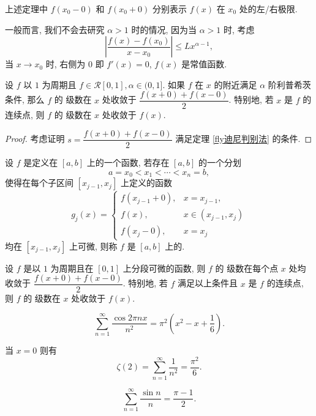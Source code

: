 \begin{remark*}
	上述定理中 $f(x_0-0)$ 和 $f(x_0+0)$ 分别表示 $f(x)$ 在 $x_0$ 处的左/右极限.
\end{remark*}

\begin{remark}
	一般而言, 我们不会去研究 $\alpha>1$ 时的情况, 因为当 $\alpha>1$ 时, 考虑 $$\left|\dfrac{f(x)-f(x_0)}{x-x_0}\right|\leqslant L x^{\alpha-1},$$ 当 $x\to x_0$ 时, 右侧为 $0$ 即 $f'(x)=0$, $f(x)$ 是常值函数.
\end{remark}

\begin{corollary}
	设 $f$ 以 $1$ 为周期且 $f\in\mathscr R[0,1],\alpha\in(0,1]$. 如果 $f$ 在 $x$ 的附近满足 $\alpha$ 阶利普希茨条件, 那么 $f$ 的 \fly 级数在 $x$ 处收敛于 $\dfrac{f(x+0)+f(x-0)}{2}$. 特别地, 若 $x$ 是 $f$ 的连续点, 则 $f$ 的 \fly 级数在 $x$ 处收敛于 $f(x)$.
\end{corollary}

\begin{proof}
	考虑证明 $s=\dfrac{f(x+0)+f(x-0)}{2}$ 满足定理 \ref{fly迪尼判别法} 的条件.
\end{proof}


\begin{definition}
	设 $f$ 是定义在 $[a,b]$ 上的一个函数, 若存在 $[a,b]$ 的一个分划 $$a=x_0<x_1<\cdots<x_n=b,$$ 使得在每个子区间 $[x_{j-1},x_j]$ 上定义的函数 $$
		g_j(x)=\left\{\begin{array}{ll}
			f(x_{j-1}+0), &x=x_{j-1},\\
			f(x),&x\in(x_{j-1},x_j) \\
			f(x_j-0), & x=x_j
		\end{array}\right.
	$$
	均在 $[x_{j-1},x_j]$ 上可微, 则称 $f$ 是 $[a,b]$ 上的.
\end{definition}

\begin{corollary}
	设 $f$ 是以 $1$ 为周期且在 $[0,1]$ 上分段可微的函数, 则 $f$ 的 \fly 级数在每个点 $x$  处均收敛于 $\dfrac{f(x+0)+f(x-0)} 2$. 特别地, 若 $f$ 满足以上条件且 $x$ 是 $f$ 的连续点, 则 $f$ 的 \fly 级数在 $x$ 处收敛于 $f(x)$.
\end{corollary}

\begin{example}\label{ex:数分fly.1}
	$$\sum\limits_{n=1}^\infty \frac{\cos 2\pi n x}{n^2}=\pi^2\left(x^2-x+\frac 1 6\right).$$
	
	当 $x=0$ 则有 $$\zeta(2)=\sum\limits_{n=1}^\infty \frac 1{n^2}=\frac {\pi^2} 6.$$
	
	$$\sum\limits_{n=1}^\infty \frac{\sin n} n=\frac{\pi-1}2.$$
\end{example}

